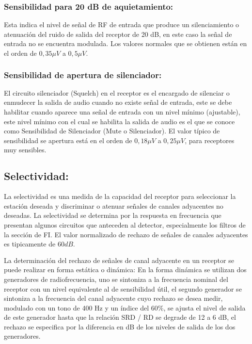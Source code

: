 \documentclass[letterpaper,10pt,spanish]{sphinxmanual}
\let\sphinxpxdimen\pdfpxdimen\else\newdimen\sphinxpxdimen
\begin{document}
\subsubsection{Sensibilidad para 20 dB de aquietamiento:}
\label{\detokenize{introduccion/sistemas:Sensibilidad-para-20-dB-de-aquietamiento:}}
Esta indica el nivel de señal de RF de entrada que produce un silenciamiento o atenuación del ruido de salida del receptor de 20 dB, en este caso la señal de entrada no se encuentra modulada. Los valores normales que se obtienen están en el orden de \(0,35 \mu V\) a \(0,5 \mu V\).


\subsubsection{Sensibilidad de apertura de silenciador:}
\label{\detokenize{introduccion/sistemas:Sensibilidad-de-apertura-de-silenciador:}}
El circuito silenciador (Squelch) en el receptor es el encargado de silenciar o enmudecer la salida de audio cuando no existe señal de entrada, este se debe habilitar cuando aparece una señal de entrada con un nivel mínimo (ajustable), este nivel mínimo con el cual se habilita la salida de audio es el que se conoce como Sensibilidad de Silenciador (Mute o Silenciador). El valor típico de sensibilidad se apertura está en el orden de \(0,18 \mu V\) a \(0,25 \mu V\), para receptores muy
sensibles.


\subsection{Selectividad:}
\label{\detokenize{introduccion/sistemas:Selectividad:}}
La selectividad es una medida de la capacidad del receptor para seleccionar la estación deseada y discriminar o atenuar señales de canales adyacentes no deseadas. La selectividad se determina por la respuesta en frecuencia que presentan algunos circuitos que anteceden al detector, especialmente los filtros de la sección de FI. El valor normalizado de rechazo de señales de canales adyacentes es tipicamente de \(60 dB\).

\sphinxincludegraphics[width=1300\sphinxpxdimen,height=875\sphinxpxdimen]{{selectividad}.png}

La determinación del rechazo de señales de canal adyacente en un receptor se puede realizar en forma estática o dinámica: En la forma dinámica se utilizan dos generadores de radiofrecuencia, uno se sintoniza a la frecuencia nominal del receptor con un nivel equivalente al de sensibilidad útil, el segundo generador se sintoniza a la frecuencia del canal adyacente cuyo rechazo se desea medir, modulado con un tono de 400 Hz y un índice del \(60\%\), se ajusta el nivel de salida de este
generador hasta que la relación SRD / RD se degrade de 12 a 6 dB, el rechazo se especifica por la diferencia en dB de los niveles de salida de los dos generadores.
\end{document}

